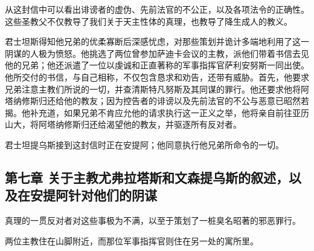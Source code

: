 从这封信中可以看出诽谤者的虚伪、先前法官的不公正，以及各项法令的正确性。这些圣教父不仅教导了我们关于天主性体的真理，也教导了降生成人的教义。\par

君士坦斯得知他兄弟的优柔寡断后深感忧虑，对那些策划并诡计多端地利用了这一阴谋的人极为愤怒。他挑选了两位曾参加萨迪卡会议的主教，派他们带着书信去见他的兄弟；他还派遣了一位以虔诚和正直著称的军事指挥官萨利安努斯一同出使。他所交付的书信，与自己相称，不仅包含恳求和劝告，还带有威胁。首先，他要求兄弟注意主教们所说的一切，并查清斯特凡努斯及其同谋的罪行。他还要求他将阿塔纳修斯归还给他的教友；因为控告者的诽谤以及先前法官的不公与恶意已昭然若揭。他补充道，如果兄弟不肯应允他的请求执行这一正义之举，他将亲自前往亚历山大，将阿塔纳修斯归还给渴望他的教友，并驱逐所有反对者。\par

君士坦提乌斯接到这封信时正在安提阿；他同意执行他兄弟所命令的一切。\par


\subsection{第七章  关于主教尤弗拉塔斯和文森提乌斯的叙述，以及在安提阿针对他们的阴谋}

真理的一贯反对者对这些事极为不满，以至于策划了一桩臭名昭著的邪恶罪行。\par

两位主教住在山脚附近，而那位军事指挥官则住在另一处的寓所里。\par

